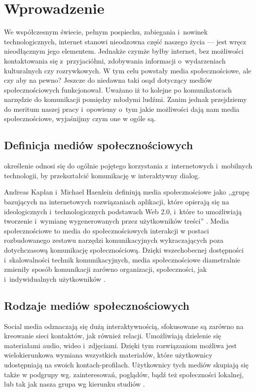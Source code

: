 \section{Wprowadzenie}
\label{sec:wprowadzenie}

We współczesnym świecie, pełnym pospiechu, zabiegania i~nowinek technologicznych, internet stanowi nieodzowna część naszego życia --- jest wręcz nieodłącznym jego elementem. Jednakże czymże byłby internet, bez możliwości kontaktowania się z~przyjaciółmi, zdobywania informacji o~wydarzeniach kulturalnych czy rozrywkowych. W tym celu powstały media społecznościowe, ale czy aby na pewno? Jeszcze do niedawna taki osąd dotyczący mediów społecznościowych funkcjonował. Uważano iż to kolejne po komunikatorach narzędzie do komunikacji pomiędzy młodymi ludźmi. Zanim jednak przejdziemy do meritum naszej pracy i~opowiemy o~tym jakie możliwości dają nam media społecznościowe, wyjaśnijmy czym one w ogóle są.

\subsection{Definicja mediów społecznościowych}

\begin{defn} określenie odnosi się do ogólnie pojętego korzystania z~internetowych i~mobilnych technologii, by przekształcić komunikację w interaktywny dialog.
\end{defn}

Andreas Kaplan i~Michael Haenlein definiują media społecznościowe jako ,,grupę bazujących na internetowych rozwiązaniach aplikacji, które opierają się na ideologicznych i~technologicznych podstawach Web 2.0, i~które to umożliwiają tworzenie i~wymianę wygenerowanych przez użytkowników treści'' \cite{url:wiki-media-spolecznosciowe}. Media społecznościowe to media do społecznościowych interakcji w postaci rozbudowanego zestawu narzędzi komunikacyjnych wykraczających poza dotychczasową komunikację społecznościową. Dzięki wszechobecnej dostępności i~skalowalności technik komunikacyjnych, media społecznościowe diametralnie zmieniły sposób komunikacji zarówno organizacji, społeczności, jak i~indywidualnych użytkowników \cite{url:wiki-media-spolecznosciowe}.


\subsection{Rodzaje mediów społecznościowych}
Social media odznaczają się dużą interaktywnością, sfokusowane są zarówno na kreowanie sieci kontaktów, jak również relacji. Umożliwiają dzielenie się materiałami audio, wideo i~zdjęciami. Dzięki tym rozwiązaniom możliwa jest wielokierunkowa wymiana wszystkich materiałów, które użytkownicy udostępniają na swoich kontach-profilach. Użytkownicy tych mediów skupiają się także w podgrupy wg. zainteresowań, poglądów, bądź też społeczności lokalnej, lub tak jak nasza grupa wg kierunku studiów \cite{url:kursusability-social-media}. 

